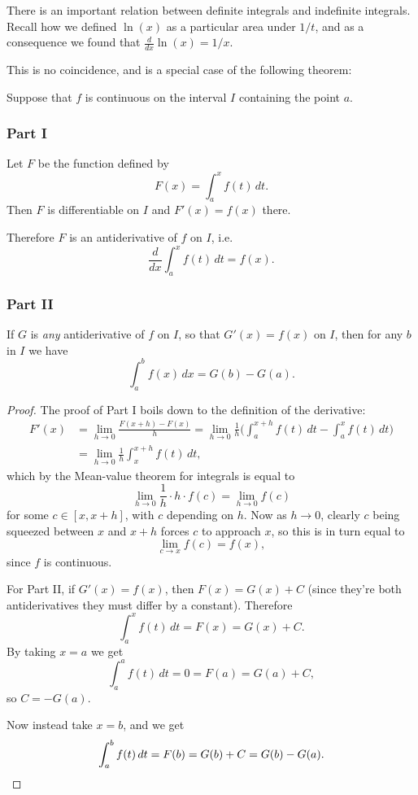
There is an important relation between definite integrals and indefinite integrals.
Recall how we defined $\ln(x)$ as a particular area under $1/t$, and as a consequence we found that $\frac{d}{d x} \ln(x) = 1/x$.

This is no coincidence, and is a special case of the following theorem:

\begin{theorem}
	Suppose that $f$ is continuous on the interval $I$ containing the point $a$.

	\subsubsection*{Part I}

	Let $F$ be the function defined by
	\[
		F(x) = \int_a^x f(t) \, d t.
	\]
	Then $F$ is differentiable on $I$ and $F'(x) = f(x)$ there.

	Therefore $F$ is an antiderivative of $f$ on $I$, i.e.
	\[
		\frac{d}{d x} \int_a^x f(t) \, d t = f(x).
	\]

	\subsubsection*{Part II}

	If $G$ is \emph{any} antiderivative of $f$ on $I$, so that $G'(x) = f(x)$ on $I$, then for any $b$ in $I$ we have
	\[
		\int_a^b f(x) \, d x = G(b) - G(a).
	\]
\end{theorem}

\begin{proof}
	The proof of Part I boils down to the definition of the derivative:
	\begin{align*}
		F'(x) & = \lim_{h \to 0} \frac{F(x + h) - F(x)}{h} = \lim_{h \to 0} \frac{1}{h} \Big ( \int_a^{x + h} f(t) \, d t - \int_a^x f(t) \, d t \Big ) \\
		      & = \lim_{h \to 0} \frac{1}{h} \int_x^{x + h} f(t) \, d t,
	\end{align*}
	which by the Mean-value theorem for integrals is equal to
	\[
		\lim_{h \to 0} \frac{1}{h} \cdot h \cdot f(c) = \lim_{h \to 0} f(c)
	\]
	for some $c \in {[{x, x+h}]}$, with $c$ depending on $h$.
	Now as $h \to 0$, clearly $c$ being squeezed between $x$ and $x + h$ forces $c$ to approach $x$, so this is in turn equal to
	\[
		\lim_{c \to x} f(c) = f(x),
	\]
	since $f$ is continuous.

	For Part II, if $G'(x) = f(x)$, then $F(x) = G(x) + C$ (since they're both antiderivatives they must differ by a constant).
	Therefore
	\[
		\int_a^x f(t) \, d t = F(x) = G(x) + C.
	\]
	By taking $x = a$ we get
	\[
		\int_a^a f(t) \, d t = 0 = F(a) = G(a) + C,
	\]
	so $C = - G(a)$.

	Now instead take $x = b$, and we get
	\[
		\int_a^b f(t) \, d t = F(b) = G(b) + C = G(b) - G(a). \qedhere
	\]
\end{proof}

